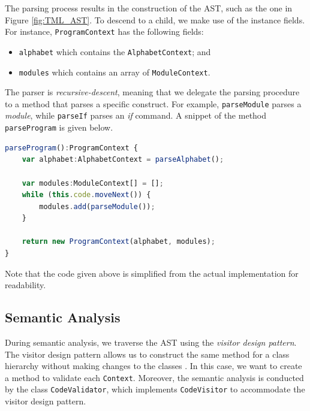 The parsing process results in the construction of the AST, such as the one in Figure \ref{fig:TML_AST}. To descend to a child, we make use of the instance fields. For instance, \texttt{ProgramContext} has the following fields:
\begin{itemize}
    \item \texttt{alphabet} which contains the \texttt{AlphabetContext}; and
    \item \texttt{modules} which contains an array of \texttt{ModuleContext}.
\end{itemize}

The parser is \emph{recursive-descent}, meaning that we delegate the parsing procedure to a method that parses a specific construct. For example, \texttt{parseModule} parses a \textit{module}, while \texttt{parseIf} parses an \textit{if} command. A snippet of the method \texttt{parseProgram} is given below.
\begin{lstlisting}[language=TypeScript]
parseProgram():ProgramContext {
    var alphabet:AlphabetContext = parseAlphabet();
    
    var modules:ModuleContext[] = [];
    while (this.code.moveNext()) {
        modules.add(parseModule());
    }
    
    return new ProgramContext(alphabet, modules);
}
\end{lstlisting}
Note that the code given above is simplified from the actual implementation for readability.

\subsection{Semantic Analysis}
During semantic analysis, we traverse the AST using the \emph{visitor design pattern}. The visitor design pattern allows us to construct the same method for a class hierarchy without making changes to the classes \citep{gamma1995design}. In this case, we want to create a method to validate each \texttt{Context}. Moreover, the semantic analysis is conducted by the class \texttt{CodeValidator}, which implements \texttt{CodeVisitor} to accommodate the visitor design pattern.

